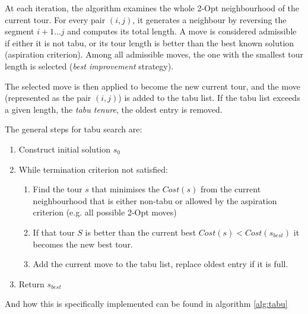 At each iteration, the algorithm examines the whole 2-Opt neighbourhood of the current tour.
For every pair $(i,j)$, it generates a neighbour by reversing the segment $i+1 \ldots j$ and computes its total length.
A move is considered admissible if either it is not tabu, or its tour length is better than the best known solution (aspiration criterion).
Among all admissible moves, the one with the smallest tour length is selected (\emph{best improvement} strategy).

The selected move is then applied to become the new current tour, and the move (represented as the pair $(i,j)$) is added to the tabu list.
If the tabu list exceeds a given length, the \emph{tabu tenure}, the oldest entry is removed.

The general steps for tabu search are:
\begin{enumerate}
	\item Construct initial solution $s_0$
	\item While termination criterion not satisfied: \begin{enumerate}
		      \item Find the tour \( s \) that minimises the \( Cost(s) \) from the current neighbourhood that is either non-tabu or allowed by the aspiration criterion (e.g. all possible 2-Opt moves)
		      \item If that tour \( S \) is better than the current best \( Cost(s) < Cost(s_{best}) \) it becomes the new best tour.
		      \item Add the current move to the tabu list, replace oldest entry if it is full.
	      \end{enumerate}
	\item Return \( s_{best} \)
\end{enumerate}
And how this is specifically implemented can be found in algorithm \ref{alg:tabu}

